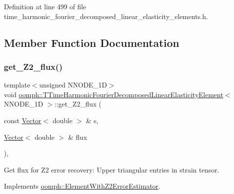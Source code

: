 Definition at line 499 of file time\+\_\+harmonic\+\_\+fourier\+\_\+decomposed\+\_\+linear\+\_\+elasticity\+\_\+elements.\+h.



\subsection{Member Function Documentation}
\mbox{\label{classoomph_1_1TTimeHarmonicFourierDecomposedLinearElasticityElement_ad910e9982be82dee39ec30f0967e00cd}} 
\subsubsection{\texorpdfstring{get\+\_\+\+Z2\+\_\+flux()}{get\_Z2\_flux()}}
{\footnotesize\ttfamily template$<$unsigned N\+N\+O\+D\+E\+\_\+1D$>$ \\
void \hyperlink{classoomph_1_1TTimeHarmonicFourierDecomposedLinearElasticityElement}{oomph\+::\+T\+Time\+Harmonic\+Fourier\+Decomposed\+Linear\+Elasticity\+Element}$<$ N\+N\+O\+D\+E\+\_\+1D $>$\+::get\+\_\+\+Z2\+\_\+flux (\begin{DoxyParamCaption}\item[{const \hyperlink{classoomph_1_1Vector}{Vector}$<$ double $>$ \&}]{s,  }\item[{\hyperlink{classoomph_1_1Vector}{Vector}$<$ double $>$ \&}]{flux }\end{DoxyParamCaption})\hspace{0.3cm}{\ttfamily [inline]}, {\ttfamily [virtual]}}



Get \textquotesingle{}flux\textquotesingle{} for Z2 error recovery\+: Upper triangular entries in strain tensor. 



Implements \hyperlink{classoomph_1_1ElementWithZ2ErrorEstimator_a5688ff5f546d81771cabad82ca5a7556}{oomph\+::\+Element\+With\+Z2\+Error\+Estimator}.




